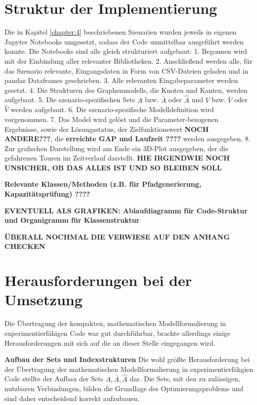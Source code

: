 \section{Struktur der Implementierung}
Die in  Kapitel \ref{chapter:4} beschriebenen Szenarien wurden jeweils in eigenen Jupyter Notebooks umgesetzt, sodass der Code unmittelbar ausgeführt werden konnte. Die Notebooks sind alle gleich strukturiert aufgebaut: 1. Begonnen wird mit der Einbindung aller relevanter Bibliotheken. 2. Anschließend werden alle, für das Szenario relevante, Eingangsdaten in Form von CSV-Dateien geladen und in pandas Dataframes geschrieben. 3. Alle relevanten Eingabeparameter werden gesetzt. 4. Die Strukturen des Graphenmodells, die Knoten und Kanten, werden aufgebaut. 5. Die szenario-spezifischen Sets $A$ bzw. $\bar{A}$ oder $\hat{A} $ und $V$ bzw. $\bar{V}$ oder $\hat{V}$ werden aufgebaut. 6. Die szenario-spezifische Modelldefinition wird vorgenommen. 7. Das Model wird gelöst und die Parameter-bezogenen Ergebnisse, sowie der Lösungsstatus, der Zielfunktionswert \textbf{NOCH ANDERE???}, die \textbf{erreichte GAP und Laufzeit ????} werden ausgegeben. 8. Zur grafischen Darstellung wird am Ende ein 3D-Plot ausgegeben, der die gefahrenen Touren im Zeitverlauf darstellt. \textbf{HIE IRGENDWIE NOCH UNSICHER, OB DAS ALLES IST UND SO BLEIBEN SOLL}

\textbf{Relevante Klassen/Methoden (z.B. für Pfadgenerierung, Kapazitätsprüfung) ????}

\textbf{EVENTUELL ALS GRAFIKEN: Ablaufdiagramm für Code-Struktur und Organigramm für Klassenstruktur}

\textbf{ÜBERALL NOCHMAL DIE VERWIESE AUF DEN ANHANG CHECKEN}

\section{Herausforderungen bei der Umsetzung}
Die Übertragung der kompakten, mathematischen Modellformulierung in experimentierfähigen Code war gut durchführbar, brachte allerdings einige Herausforderungen mit sich auf die an dieser Stelle eingegangen wird.

\textbf{Aufbau der Sets und Indexstrukturen}
Die wohl größte Herausforderung bei der Übertragung der mathematischen Modellformulierung in experimentierfähgien Code stellte der Aufbau der Sets $A, \bar{A}, \hat{A}$ dar. Die Sets, mit den zu zulässigen, nutzbaren Verbindungen, bilden die Grundlage des Optimierungsproblems und sind daher entscheidend korrekt aufzubauen.

